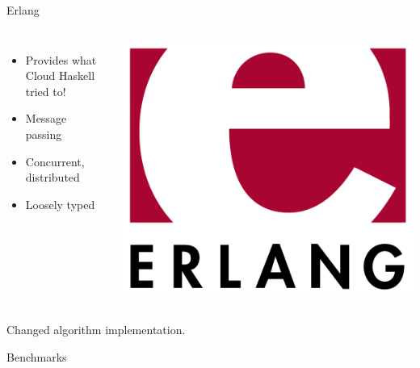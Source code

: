 \documentclass[14pt]{beamer}
\begin{document}
\begin{frame}{Erlang}
    \begin{columns}
        \begin{itemize}
            \item<1> Provides what Cloud Haskell tried to!
            \item<1> Message passing
            \item<1> Concurrent, distributed
            \item Loosely typed
        \end{itemize}
        \includegraphics[width=\textwidth]{images/erlang-logo.pdf}
    \end{columns}
    \pause
    \vspace{2cm}
    Changed algorithm implementation.
\end{frame}

\begin{frame}{Benchmarks}

\end{frame}
\end{document}
